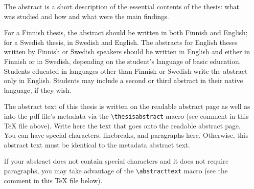\documentclass[english, 12pt, a4paper, sci, utf8, a-2b, online]{aaltothesis}
\date{9 February 2023}
\begin{document}
\makecoverpage

\makecopyrightpage

\clearpage

\begin{abstractpage}[english]
  The abstract is a short description of the essential contents of the thesis:
  what was studied and how and what were the main findings.

  For a Finnish thesis, the abstract should be written in both Finnish and
  English; for a Swedish thesis, in Swedish and English. The abstracts for
  English theses written by Finnish or Swedish speakers should be written in
  English and either in Finnish or in Swedish, depending on the student’s
  language of basic education. Students educated in languages other than Finnish
  or Swedish write the abstract only in English. Students may include a second
  or third abstract in their native language, if they wish.

  The abstract text of this thesis is written on the readable abstract page as
  well as into the pdf file's metadata via the \verb+\thesisabstract+ macro
  (see comment in this \TeX{} file above). Write here the text that goes onto
  the readable abstract page. You can have special characters, linebreaks, and
  paragraphs here. Otherwise, this abstract text must be identical to the
  metadata abstract text.
  
  If your abstract does not contain special characters and it does not require
  paragraphs, you may take advantage of the \verb+\abstracttext+ macro (see the
  comment in this \TeX{} file below).
\end{abstractpage}

\end{document}
